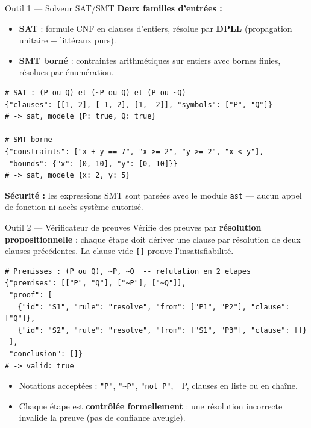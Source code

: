 \documentclass[10pt,aspectratio=169]{beamer}
\begin{document}
\begin{frame}[fragile]{Outil 1 --- Solveur SAT/SMT}
  \textbf{Deux familles d'entrées :}
  \begin{itemize}
    \item \textbf{SAT} : formule CNF en clauses d'entiers, résolue par
          \textbf{DPLL} (propagation unitaire + littéraux purs).
    \item \textbf{SMT borné} : contraintes arithmétiques sur entiers avec
          bornes finies, résolues par énumération.
  \end{itemize}
  \vfill
\begin{lstlisting}
# SAT : (P ou Q) et (~P ou Q) et (P ou ~Q)
{"clauses": [[1, 2], [-1, 2], [1, -2]], "symbols": ["P", "Q"]}
# -> sat, modele {P: true, Q: true}

# SMT borne
{"constraints": ["x + y == 7", "x >= 2", "y >= 2", "x < y"],
 "bounds": {"x": [0, 10], "y": [0, 10]}}
# -> sat, modele {x: 2, y: 5}
\end{lstlisting}
  \vfill
  \textbf{Sécurité :} les expressions SMT sont parsées avec le module
  \texttt{ast} --- aucun appel de fonction ni accès système autorisé.
\end{frame}

\begin{frame}[fragile]{Outil 2 --- Vérificateur de preuves}
  Vérifie des preuves par \textbf{résolution propositionnelle} : chaque
  étape doit dériver une clause par résolution de deux clauses précédentes.
  La clause vide \texttt{[]} prouve l'insatisfiabilité.
  \vfill
\begin{lstlisting}
# Premisses : (P ou Q), ~P, ~Q  -- refutation en 2 etapes
{"premises": [["P", "Q"], ["~P"], ["~Q"]],
 "proof": [
   {"id": "S1", "rule": "resolve", "from": ["P1", "P2"], "clause": ["Q"]},
   {"id": "S2", "rule": "resolve", "from": ["S1", "P3"], "clause": []}
 ],
 "conclusion": []}
# -> valid: true
\end{lstlisting}
  \vfill
  \begin{itemize}
    \item Notations acceptées : \texttt{"P"}, \texttt{"\textasciitilde P"},
          \texttt{"not P"}, $\neg$P, clauses en liste ou en chaîne.
    \item Chaque étape est \textbf{contrôlée formellement} : une résolution
          incorrecte invalide la preuve (pas de confiance aveugle).
  \end{itemize}
\end{frame}
\end{document}
